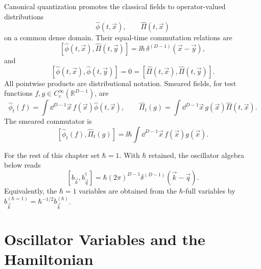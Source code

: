 \begin{definition}
\label{def:equal-time-scalar-ccr}
Canonical quantization promotes the classical fields to operator-valued
distributions
\[
  \widehat\phi(t,\vec x),\qquad \widehat\Pi(t,\vec x)
\]
on a common dense domain. Their equal-time commutation relations are
\[
  [\widehat\phi(t,\vec x),\widehat\Pi(t,\vec y)]
  =
  \ii\hbar\,\delta^{(D-1)}(\vec x-\vec y),
\]
and
\[
  [\widehat\phi(t,\vec x),\widehat\phi(t,\vec y)]
  =
  0
  =
  [\widehat\Pi(t,\vec x),\widehat\Pi(t,\vec y)].
\]
All pointwise products are distributional notation. Smeared fields, for
test functions \(f,g\in C_c^\infty(\mathbb R^{D-1})\), are
\[
  \widehat\phi_t(f)=\int\dd^{D-1}\vec x\,f(\vec x)\widehat\phi(t,\vec x),
  \qquad
  \widehat\Pi_t(g)=\int\dd^{D-1}\vec x\,g(\vec x)\widehat\Pi(t,\vec x).
\]
The smeared commutator is
\[
  [\widehat\phi_t(f),\widehat\Pi_t(g)]
  =
  \ii\hbar
  \int\dd^{D-1}\vec x\,f(\vec x)g(\vec x).
\]
\end{definition}

For the rest of this chapter set \(\hbar=1\). With \(\hbar\) retained, the
oscillator algebra below reads
\[
  [b_{\vec k},b^\dagger_{\vec q}]
  =
  \hbar(2\pi)^{D-1}\delta^{(D-1)}(\vec k-\vec q).
\]
Equivalently, the \(\hbar=1\) variables are obtained from the \(\hbar\)-full
variables by \(b_{\vec k}^{(\hbar=1)}=\hbar^{-1/2}b_{\vec k}^{(\hbar)}\).

\section{Oscillator Variables and the Hamiltonian}

